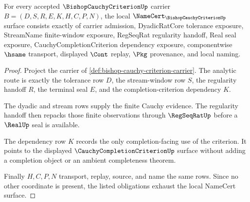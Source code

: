 \begin{theorem}
\label{thm:bishop-cauchy-criterion-namecert-obligations}
For every accepted $\BishopCauchyCriterionUp$ carrier $B=(D,S,R,E,K,H,C,P,N)$, the local $\NameCert_{\BishopCauchyCriterionUp}$ surface consists exactly of carrier admission, DyadicRatCore tolerance exposure, StreamName finite-window exposure, RegSeqRat regularity handoff, Real seal exposure, CauchyCompletionCriterion dependency exposure, componentwise $\hsame$ transport, displayed $\Cont$ replay, $\Pkg$ provenance, and local naming.
\end{theorem}
\begin{proof}
Project the carrier of \autoref{def:bishop-cauchy-criterion-carrier}. The analytic route is exactly the tolerance row $D$, the stream-window row $S$, the regularity handoff $R$, the terminal seal $E$, and the completion-criterion dependency $K$.

The dyadic and stream rows supply the finite Cauchy evidence. The regularity handoff then repacks those finite observations through $\RegSeqRatUp$ before a $\RealUp$ seal is available.

The dependency row $K$ records the only completion-facing use of the criterion. It points to the displayed $\CauchyCompletionCriterionUp$ surface without adding a completion object or an ambient completeness theorem.

Finally $H,C,P,N$ transport, replay, source, and name the same rows. Since no other coordinate is present, the listed obligations exhaust the local NameCert surface.
\end{proof}

